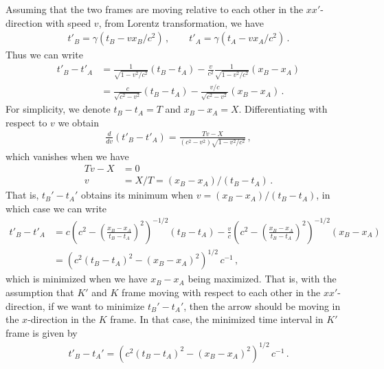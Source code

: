 \documentclass[11pt, onesided]{book}
\theoremstyle{break}
\theoremstyle{break}
\begin{document}
Assuming that the two frames are moving relative to each other in the $xx'$-direction with speed $v$, from Lorentz transformation, we have
\begin{align*}
t'_B = \gamma(t_B - vx_B/c^2)\,,\qquad
t'_A = \gamma(t_A - vx_A/c^2)\,.
\end{align*}
Thus we can write
\begin{align*}
t'_B - t'_A 
&=\frac{1}{\sqrt{1 - v^2/c^2}} (t_B - t_A) - \frac{v}{c^2}\frac{1}{\sqrt{1 - v^2/c^2}}(x_B-x_A)\\
&=\frac{c}{\sqrt{c^2 - v^2}} (t_B - t_A) - \frac{v/c}{\sqrt{c^2 - v^2}}(x_B-x_A)
\,.
\end{align*}
For simplicity, we denote $t_B - t_A = T$ and $x_B - x_A = X$. Differentiating with respect to $v$ we obtain
\begin{align*}
\frac{d}{dv} (t'_B - t'_A) = \frac{Tv-X}{(c^2 - v^2) \sqrt{1-v^2/c^2}}\,,
\end{align*}
which vanishes when we have
\begin{align*}
Tv-X &= 0\\
v&=X/T = (x_B-x_A) / (t_B-t_A)\,.
\end{align*}
That is, $t_B' - t_A'$ obtains its minimum when $v = (x_B - x_A)/(t_B - t_A)$, in which case we can write
\begin{align*}
t'_B - t'_A &= 
c\left( c^2 -\left( \frac{x_B - x_A}{t_B - t_A}\right)^2
\right)^{-1/2} (t_B - t_A) - \frac{v}{c}\left( c^2 -\left( \frac{x_B - x_A}{t_B - t_A}\right)^2\right)^{-1/2} (x_B - x_A)\\
&= \left(c^2(t_B - t_A)^2 -(x_B - x_A)^2\right)^{1/2}\,c^{-1}\,,
\end{align*}
which is minimized when we have $x_B - x_A$ being maximized. That is, with the assumption that $K'$ and $K$ frame moving with respect to each other in the $xx'$-direction,
if we want to minimize $t_B' - t_A'$, then the arrow should be moving in the $x$-direction in the $K$ frame. In that case, the minimized time interval in $K'$ frame is given by
\begin{align}
t'_B -t_A' = \left(c^2(t_B - t_A)^2 -(x_B - x_A)^2\right)^{1/2} \, c^{-1}\,.
\end{align}
\newpage
\end{document}
